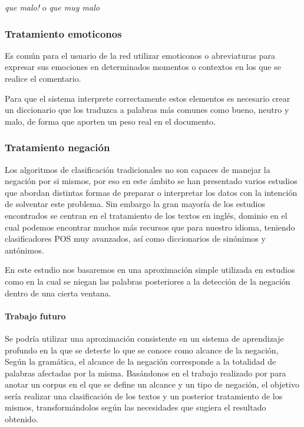 \textit{ que malo! } o \textit{ que muy malo }

\subsubsection{Tratamiento emoticonos}

Es común para el usuario de la red utilizar emoticonos o abreviaturas para expresar sus emociones en determinados momentos o contextos en los que se realice el comentario.

Para que el sistema interprete correctamente estos elementos es necesario crear un diccionario que los traduzca a palabras más comunes como bueno, neutro y malo, de forma que aporten un peso real en el documento.

\subsubsection{Tratamiento negación}\label{negtrat}

Los algoritmos de clasificación tradicionales no son capaces de manejar la negación por si mismos, por eso en este ámbito se han presentado varios estudios que abordan distintas formas de preparar o interpretar los datos con la intención de solventar este problema. Sin embargo la gran mayoría de los estudios encontrados se centran en el tratamiento de los textos en inglés, dominio en el cual podemos encontrar muchos más recursos que para nuestro idioma, teniendo clasificadores POS muy avanzados, así como diccionarios de sinónimos y antónimos.

En este estudio nos basaremos en una aproximación simple utilizada en estudios como \cite{Coupling} \cite{Custreviews} en la cual se niegan las palabras posteriores a la detección de la negación dentro de una cierta ventana.

\paragraph{Trabajo futuro} Se podría utilizar una aproximación consistente en un sistema de aprendizaje profundo en la que se detecte lo que se conoce como alcance de la negación, Según la gramática, el alcance de la negación corresponde a la totalidad de palabras afectadas por la misma. Basándonos en el trabajo realizado por \cite{Negacion} para anotar un corpus en el que se define un alcance y un tipo de negación, el objetivo sería realizar una clasificación de los textos y un posterior tratamiento de los mismos, transformándolos según las necesidades que sugiera el resultado obtenido.

